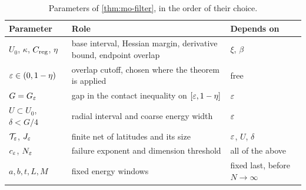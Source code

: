 \begin{table}[ht]
\centering
\small
\begin{tabular}{@{}>{\raggedright\arraybackslash}p{}>{\raggedright\arraybackslash}p{}>{\raggedright\arraybackslash}p{}@{}}
\toprule
Parameter & Role & Depends on\\
\midrule
$U_0$, $\kappa$, $C_{\rm reg}$, $\eta$ & base interval, Hessian margin, derivative bound, endpoint overlap & $\xi$, $\beta$\\
$\varepsilon\in(0,1-\eta)$ & overlap cutoff, chosen where the theorem is applied & free\\
$G=G_\varepsilon$ & gap in the contact inequality on $[\varepsilon,1-\eta]$ & $\varepsilon$\\
$U\subset U_0$, $\delta<G/4$ & radial interval and coarse energy width & $\varepsilon$\\
$\mathcal T_\varepsilon$, $J_\varepsilon$ & finite net of latitudes and its size & $\varepsilon$, $U$, $\delta$\\
$c_\varepsilon$, $N_\varepsilon$ & failure exponent and dimension threshold & all of the above\\
$a,b,t,L,M$ & fixed energy windows & fixed last, before $N\to\infty$\\
\bottomrule
\end{tabular}
\caption{Parameters of \cref{thm:mo-filter}, in the order of their choice.}\label{tab:mo-parameters}
\end{table}

